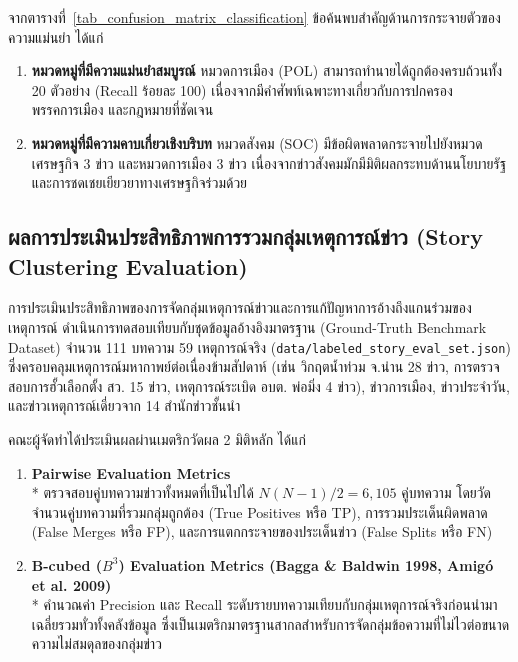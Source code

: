 จากตารางที่~\ref{tab_confusion_matrix_classification} ข้อค้นพบสำคัญด้านการกระจายตัวของความแม่นยำ ได้แก่
\begin{enumerate}
    \item \textbf{หมวดหมู่ที่มีความแม่นยำสมบูรณ์}\newline
    หมวดการเมือง (POL) สามารถทำนายได้ถูกต้องครบถ้วนทั้ง 20 ตัวอย่าง (Recall ร้อยละ 100) เนื่องจากมีคำศัพท์เฉพาะทางเกี่ยวกับการปกครอง พรรคการเมือง และกฎหมายที่ชัดเจน
    \item \textbf{หมวดหมู่ที่มีความคาบเกี่ยวเชิงบริบท}\newline
    หมวดสังคม (SOC) มีข้อผิดพลาดกระจายไปยังหมวดเศรษฐกิจ 3 ข่าว และหมวดการเมือง 3 ข่าว เนื่องจากข่าวสังคมมักมีมิติผลกระทบด้านนโยบายรัฐและการชดเชยเยียวยาทางเศรษฐกิจร่วมด้วย
\end{enumerate}

\subsection{ผลการประเมินประสิทธิภาพการรวมกลุ่มเหตุการณ์ข่าว (Story Clustering Evaluation)}

การประเมินประสิทธิภาพของการจัดกลุ่มเหตุการณ์ข่าวและการแก้ปัญหาการอ้างถึงแกนร่วมของเหตุการณ์ ดำเนินการทดสอบเทียบกับชุดข้อมูลอ้างอิงมาตรฐาน (Ground-Truth Benchmark Dataset) จำนวน 111 บทความ 59 เหตุการณ์จริง (\texttt{data/labeled\_story\_eval\_set.json}) ซึ่งครอบคลุมเหตุการณ์มหากาพย์ต่อเนื่องข้ามสัปดาห์ (เช่น วิกฤตน้ำท่วม จ.น่าน 28 ข่าว, การตรวจสอบการฮั้วเลือกตั้ง สว. 15 ข่าว, เหตุการณ์ระเบิด อบต. พ่อมิ่ง 4 ข่าว), ข่าวการเมือง, ข่าวประจำวัน, และข่าวเหตุการณ์เดี่ยวจาก 14 สำนักข่าวชั้นนำ

คณะผู้จัดทำได้ประเมินผลผ่านเมตริกวัดผล 2 มิติหลัก ได้แก่
\begin{enumerate}
    \item \textbf{Pairwise Evaluation Metrics}\\*
    ตรวจสอบคู่บทความข่าวทั้งหมดที่เป็นไปได้ $N(N-1)/2 = 6,105$ คู่บทความ โดยวัดจำนวนคู่บทความที่รวมกลุ่มถูกต้อง (True Positives หรือ TP), การรวมประเด็นผิดพลาด (False Merges หรือ FP), และการแตกกระจายของประเด็นข่าว (False Splits หรือ FN)
    \item \textbf{B-cubed ($B^3$) Evaluation Metrics (Bagga \& Baldwin 1998, Amigó et al. 2009)}\\*
    คำนวณค่า Precision และ Recall ระดับรายบทความเทียบกับกลุ่มเหตุการณ์จริงก่อนนำมาเฉลี่ยรวมทั่วทั้งคลังข้อมูล ซึ่งเป็นเมตริกมาตรฐานสากลสำหรับการจัดกลุ่มข้อความที่ไม่ไวต่อขนาดความไม่สมดุลของกลุ่มข่าว
\end{enumerate}

